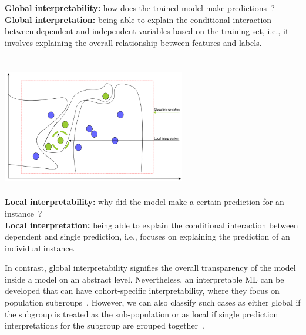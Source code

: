 \vspace{1mm}
\begin{tcolorbox}[colback=white!3!white,colframe=gray!120!black,title=\faBook~Local vs. global interpretation]
    \scriptsize{
        \textbf{Global interpretability:} how does the trained model make predictions~\cite{molnar2019interpretable}? \\
        \textbf{Global interpretation:} being able to explain the conditional interaction between dependent and independent variables based on the training set, i.e., it involves explaining the overall relationship between features and labels.
        } \\ \\
    \includegraphics[width=0.6\textwidth,height=60mm]{images/lvg.png}\\ 
    \scriptsize{
        \textbf{Local interpretability:} why did the model make a certain prediction for an instance~\cite{molnar2019interpretable}? \\
         \textbf{Local interpretation:} being able to explain the conditional interaction between dependent and single prediction, i.e., focuses on explaining the prediction of an individual instance. 
        } 
\end{tcolorbox}

\hspace*{3.5mm} In contrast, global interpretability signifies the overall transparency of the model inside a model on an abstract level. Nevertheless, an interpretable ML can be developed that can have cohort-specific interpretability, where they focus on population subgroups~\cite{stiglic2020interpretability}. However, we can also classify such cases as either global if the subgroup is treated as the sub-population or as local if single prediction interpretations for the subgroup are grouped together~\cite{molnar2019interpretable}. 

